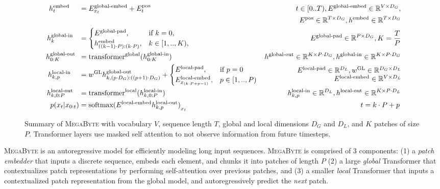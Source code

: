 \documentclass{article}
\newcommand{\fastslow}[0]{\textsc{MegaByte}\xspace}
\newcommand{\megabyte}[0]{\fastslow}
\newcommand{\h}[1]{h^\text{#1}}
\newcommand{\inR}[1]{\in\mathbb{R}^{#1}}
\newcommand{\transformer}[2]{\text{transformer}^{\text{#1}}(#2)}
\theoremstyle{plain}
\theoremstyle{definition}
\theoremstyle{remark}
\begin{document}
\begin{figure}[t]
\begin{minipage}{0.7\linewidth}
\begin{align*}
\h{embed}_{t}\,\,\,\,\,\,\,\,&= E^\text{global-embed}_{x_t}+E^\text{pos}_t  & t\in [0..T), E^{\text{global-embed}}\inR{V\times D_G},\\& &E^{\text{pos}}\inR{T\times D_G}, \h{embed}\inR{T\times D_G}  \\
\h{global-in}_{k} \,\,\,\,\,&= 
\begin{cases}
E^{\text{global-pad}}, & \text{if } k = 0, \\
\h{embed}_{((k-1)\cdot P):(k \cdot P)}, & k\in [1,..,K),  \\
\end{cases}  & E^{\text{global-pad}}\inR{P\times D_G}, K=\frac{T}{P}
\\
\h{global-out}_{0:K} \,\,\,&= \transformer{global}{\h{global-in}_{0:K}}  & \h{global-out}\inR{K\times P\cdot D_G},\h{global-in}\inR{K\times P\cdot D_G}\\
\h{local-in}_{k,p} \,\,\,\,\,\,\,&= w^{\text{GL}}\h{global-out}_{k,(p\cdot D_G):((p+1)\cdot D_G)} + 
\begin{cases}
E^\text{local-pad}, & \text{if } p=0   \\
E^\text{local-embed}_{x_{(k\cdot P + p - 1)}}, & p\in [1,..,P)   \\
\end{cases} &  
\begin{array}{r}
E^{\text{local-pad}}\inR{D_L} , w^{\text{GL}}\inR{D_G\times D_L}\\ E^{\text{local-embed}}\inR{V\times D_L}
\end{array}\hspace{-2mm}
\\
\h{local-out}_{k,0:P} \,\,\,\,\,&= \transformer{local}{\h{local-in}_{k,0:P}}  & \h{local-in}_{k,p}\inR{D_L}, \h{local-out}\inR{K\times P\cdot D_L} \\
p(x_{t}|x_{0:t}) &= \text{softmax}{(E^\text{local-embed}\h{local-out}_{k,p})}_{x_t}  & t=k\cdot P+p\,
\end{align*}
\end{minipage}
\caption{Summary of \megabyte with vocabulary $V$, sequence length $T$, global and local dimensions $D_G$ and $D_L$, and $K$ patches of size $P$. Transformer layers use masked self attention to not observe information from future timesteps. 
}
\end{figure}

\megabyte is an autoregressive model for efficiently modeling long input sequences. \megabyte is comprised of 3 components: (1) a \emph{patch embedder} that inputs a discrete sequence, embeds each element, and chunks it into patches of length $P$ (2) a large \emph{global} Transformer that contextualizes patch representations by performing self-attention over previous patches, and (3) a smaller \emph{local} Transformer that inputs a contextualized patch representation from the global model, and autoregressively predict the \emph{next} patch.
\end{document}
